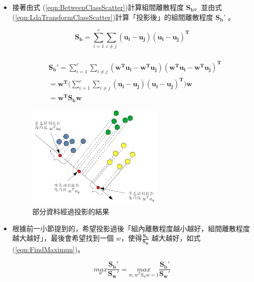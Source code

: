 \begin{itemize}
	\item
		接著由式 (\ref{eqn:BetweenClassScatter})計算組間離散程度 \(\mathbf{S_b}\)。並由式 (\ref{eqn:LdaTransformClassScatter})計算「投影後」的組間離散程度 \(\mathbf{{S_b}'}\) 。

	      \begin{equation}
		      \label{eqn:BetweenClassScatter}
		      \mathbf{S_b} =\sum_{i=1}^{c}\sum_{i \neq j } \mathbf{(u_i - u_j)(u_i - u_j)^T}
	      \end{equation}

	      \begin{equation}
		      \label{eqn:LdaTransformClassScatter}
		      \begin{aligned}
			      \\&\mathbf{{S_b}'} =\sum_{i=1}^{c}\sum_{i \neq j } \mathbf{(w^Tu_i - w^Tu_j)(w^Tu_i - w^Tu_j)^T}
			      \\& =\mathbf{w^T}(\sum_{i=1}^{c}\sum_{i \neq j } \mathbf{(u_i - u_j)(u_i - u_j)^T)w}
			      \\& =\mathbf{w^TS_bw}
		      \end{aligned}
	      \end{equation}



	      \begin{figure}[H]
		      \centering
		      \includegraphics[height=5cm]{./pic/bugfxgEn.png}
		      \caption{部分資料經過投影的結果}
		      \label{fig:LdaTransform}
	      \end{figure}

	\item
	      根據前一小節提到的，希望投影過後「組內離散程度越小越好，組間離散程度越大越好」，最後會希望找到一個 \(w\)，使得\(\frac{\mathbf{S_b}}{\mathbf{S_w}}\) 越大越好，如式(\ref{eqn:FindMaximun})。

	      \begin{equation}
		      \label{eqn:FindMaximun}
		      \underset{w}{max}\frac{\mathbf{{S_b}'}}{\mathbf{{S_w}'}} =\underset{w,w^TS_ww = 1}{max}\frac{\mathbf{{S_b}'}}{\mathbf{{S_w}'}}
	      \end{equation}



\end{itemize}
